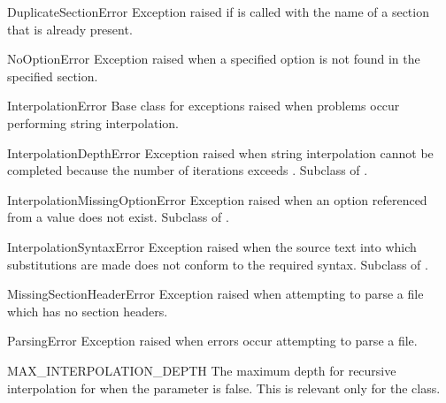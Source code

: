 \begin{excdesc}{DuplicateSectionError}
Exception raised if  is called with the name of
a section that is already present.
\end{excdesc}

\begin{excdesc}{NoOptionError}
Exception raised when a specified option is not found in the specified 
section.
\end{excdesc}

\begin{excdesc}{InterpolationError}
Base class for exceptions raised when problems occur performing string
interpolation.
\end{excdesc}

\begin{excdesc}{InterpolationDepthError}
Exception raised when string interpolation cannot be completed because
the number of iterations exceeds .
Subclass of .
\end{excdesc}

\begin{excdesc}{InterpolationMissingOptionError}
Exception raised when an option referenced from a value does not exist.
Subclass of .
\end{excdesc}

\begin{excdesc}{InterpolationSyntaxError}
Exception raised when the source text into which substitutions are
made does not conform to the required syntax.
Subclass of .
\end{excdesc}

\begin{excdesc}{MissingSectionHeaderError}
Exception raised when attempting to parse a file which has no section
headers.
\end{excdesc}

\begin{excdesc}{ParsingError}
Exception raised when errors occur attempting to parse a file.
\end{excdesc}

\begin{datadesc}{MAX_INTERPOLATION_DEPTH}
The maximum depth for recursive interpolation for  when
the  parameter is false.  This is relevant only for the
 class.
\end{datadesc}


